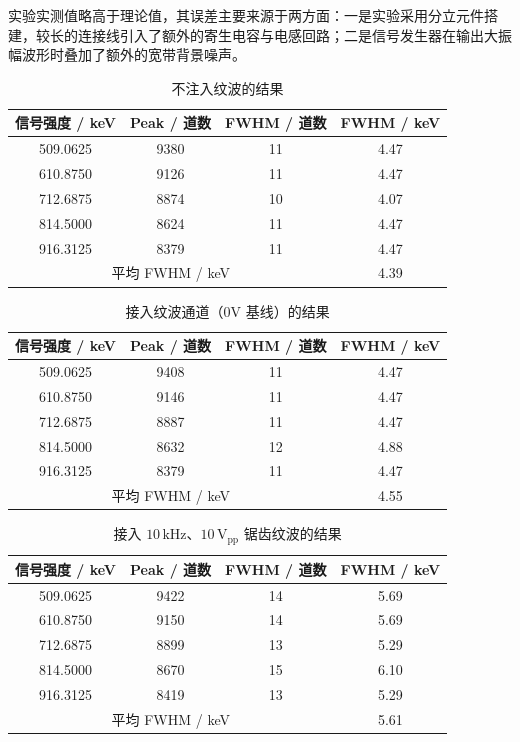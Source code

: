 \documentclass[12pt,fontset=fandol]{ctexart}
\begin{document}
实验实测值略高于理论值，其误差主要来源于两方面：一是实验采用分立元件搭建，较长的连接线引入了额外的寄生电容与电感回路；二是信号发生器在输出大振幅波形时叠加了额外的宽带背景噪声。

\newpage
\begin{table}[!h]
\centering
\caption{不注入纹波的结果}
\label{tab:no_ripple}
\begin{tabular}{cccc}
\toprule
信号强度 / keV & Peak / 道数 & FWHM / 道数 & FWHM / keV \\
\midrule
509.0625 & 9380 & 11 & 4.47 \\
610.8750 & 9126 & 11 & 4.47 \\
712.6875 & 8874 & 10 & 4.07 \\
814.5000 & 8624 & 11 & 4.47 \\
916.3125 & 8379 & 11 & 4.47 \\
\midrule
\multicolumn{3}{c}{平均 FWHM / keV} & 4.39 \\
\bottomrule
\end{tabular}
\end{table}

\begin{table}[!h]
\centering
\caption{接入纹波通道（0V 基线）的结果}
\label{tab:zero_ripple}
\begin{tabular}{cccc}
\toprule
信号强度 / keV & Peak / 道数 & FWHM / 道数 & FWHM / keV \\
\midrule
509.0625 & 9408 & 11 & 4.47 \\
610.8750 & 9146 & 11 & 4.47 \\
712.6875 & 8887 & 11 & 4.47 \\
814.5000 & 8632 & 12 & 4.88 \\
916.3125 & 8379 & 11 & 4.47 \\
\midrule
\multicolumn{3}{c}{平均 FWHM / keV} & 4.55 \\
\bottomrule
\end{tabular}
\end{table}

\begin{table}[!h]
\centering
\caption{接入 $10\,\mathrm{kHz}$、$10\,\mathrm{V_{pp}}$ 锯齿纹波的结果}
\label{tab:saw_ripple}
\begin{tabular}{cccc}
\toprule
信号强度 / keV & Peak / 道数 & FWHM / 道数 & FWHM / keV \\
\midrule
509.0625 & 9422 & 14 & 5.69 \\
610.8750 & 9150 & 14 & 5.69 \\
712.6875 & 8899 & 13 & 5.29 \\
814.5000 & 8670 & 15 & 6.10 \\
916.3125 & 8419 & 13 & 5.29 \\
\midrule
\multicolumn{3}{c}{平均 FWHM / keV} & 5.61 \\
\bottomrule
\end{tabular}
\end{table}
\end{document}
